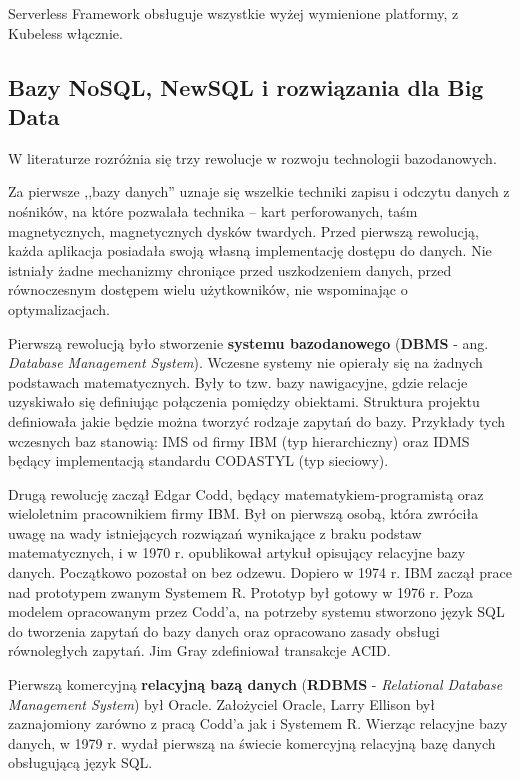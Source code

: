 \documentclass[12pt,a4paper,twoside,titlepage,openright]{book}
\begin{document}
Serverless Framework obsługuje wszystkie wyżej wymienione platformy, z Kubeless włącznie.\cite{siteServerlessFramework}


\subsection{Bazy NoSQL, NewSQL i rozwiązania dla Big Data} \label{section:nosql}

W literaturze rozróżnia się trzy rewolucje w rozwoju technologii bazodanowych.  \cite{noSqlHistory}

Za pierwsze ,,bazy danych'' uznaje się wszelkie techniki zapisu i odczytu danych z nośników, na które pozwalała technika -- kart perforowanych, taśm magnetycznych, magnetycznych dysków twardych. Przed pierwszą rewolucją, każda aplikacja posiadała swoją własną implementację dostępu do danych. Nie istniały żadne mechanizmy chroniące przed uszkodzeniem danych, przed równoczesnym dostępem wielu użytkowników, nie wspominając o optymalizacjach. 

Pierwszą rewolucją było stworzenie \textbf{systemu bazodanowego} (\textbf{DBMS} - ang. \textit{Database Management System}). Wczesne systemy nie opierały się na żadnych podstawach matematycznych. Były to tzw. bazy nawigacyjne, gdzie relacje uzyskiwało się definiując połączenia pomiędzy obiektami. Struktura projektu definiowała jakie będzie można tworzyć rodzaje zapytań do bazy. Przykłady tych wczesnych baz stanowią: IMS od firmy IBM (typ hierarchiczny) oraz IDMS będący implementacją standardu CODASTYL (typ sieciowy). 

Drugą rewolucję zaczął Edgar Codd, będący matematykiem-programistą oraz wieloletnim pracownikiem firmy IBM. Był on pierwszą osobą, która zwróciła uwagę na wady istniejących rozwiązań wynikające z braku podstaw matematycznych, i w 1970 r. opublikował artykuł opisujący relacyjne bazy danych. Początkowo pozostał on bez odzewu. Dopiero w 1974 r. IBM zaczął prace nad prototypem zwanym Systemem R. Prototyp był gotowy w 1976 r. Poza modelem opracowanym przez Codd'a, na potrzeby systemu stworzono język SQL do tworzenia zapytań do bazy danych oraz opracowano zasady obsługi równoległych zapytań. Jim Gray zdefiniował transakcje ACID.

Pierwszą komercyjną \textbf{relacyjną bazą danych} (\textbf{RDBMS} - \textit{Relational Database Management System}) był Oracle. Założyciel Oracle, Larry Ellison był zaznajomiony zarówno z pracą Codd'a jak i Systemem R. Wierząc relacyjne bazy danych, w 1979 r. wydał pierwszą na świecie komercyjną relacyjną bazę danych obsługującą język SQL. \cite{relationalDbs}
\end{document}
